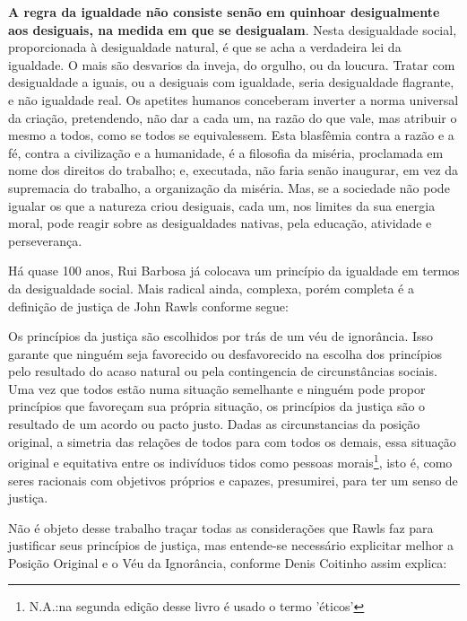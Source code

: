 \documentclass[
	12pt,				%
	openright,			%
	twoside,			%
	a4paper,			%
	chapter=TITLE,		%
	section=TITLE,		%
	subsection=TITLE,	%
	subsubsection=TITLE,%
	spanish,            %
	english,			%
	brazil				%
	]{abntex2}
\begin{document}
\begin{citacao}
	\textbf{A regra da igualdade não consiste senão em quinhoar desigualmente aos desiguais, na medida em que se desigualam}. Nesta desigualdade social, proporcionada à desigualdade natural, é que se acha
	a verdadeira lei da igualdade. O mais são desvarios da inveja, do orgulho, ou da loucura. Tratar com desigualdade a iguais, ou a desiguais com igualdade, seria desigualdade flagrante, e não igualdade
	real. Os apetites humanos conceberam inverter a norma universal	da criação, pretendendo, não dar a cada um, na razão do que vale, mas atribuir o mesmo a todos, como se todos se equivalessem.
	Esta blasfêmia contra a razão e a fé, contra a civilização e a humanidade, é a filosofia da miséria, proclamada em nome dos direitos do trabalho; e, executada, não faria senão inaugurar, em vez da
	supremacia do trabalho, a organização da miséria. Mas, se a sociedade não pode igualar os que a natureza criou 	desiguais, cada um, nos limites da sua energia moral, pode reagir 	sobre as desigualdades nativas, pela educação, atividade e perseverança. \cite[p. ~26, grifo do autor]{Rui}
\end{citacao}
\par
Há quase 100 anos, Rui Barbosa já colocava um princípio da igualdade em termos da desigualdade social. Mais radical ainda, complexa, porém completa é a definição de justiça de John Rawls  conforme segue:
\begin{citacao}
	Os princípios da justiça são escolhidos por trás de um véu de ignorância. Isso garante que ninguém seja favorecido ou desfavorecido na escolha dos princípios pelo resultado do acaso natural ou pela contingencia de circunstâncias sociais. Uma vez que todos estão numa situação semelhante e ninguém pode propor princípios que favoreçam sua própria situação, os princípios da justiça são o resultado de um acordo ou pacto justo. Dadas as circunstancias da posição original, a simetria das relações de todos para com todos os demais, essa situação original e equitativa entre os indivíduos tidos como pessoas morais\footnote{N.A.:na segunda edição desse livro é usado o termo 'éticos'}, isto é, como seres racionais com objetivos próprios e capazes, presumirei, para ter um senso de justiça.\cite[p. ~15]{Rawls}\\
\end{citacao}
\par
Não é objeto desse trabalho traçar todas as considerações que Rawls faz para justificar seus princípios de justiça, mas entende-se necessário explicitar melhor a Posição Original e o Véu da Ignorância, conforme Denis Coitinho assim explica:
\end{document}
